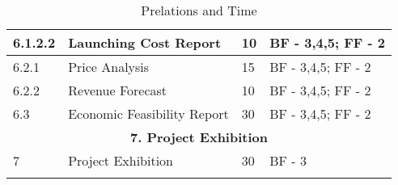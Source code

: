 \begin{longtable}{ | p{1.3cm} | p{7cm} | p{3cm} | p{3.5cm} |}
6.1.2.2 & Launching Cost Report  & 10 & BF - 3,4,5; FF - 2 \\ \hline
6.2.1 & Price Analysis & 15 & BF - 3,4,5; FF - 2  \\ \hline
6.2.2 & Revenue Forecast & 10 &BF - 3,4,5; FF - 2  \\ \hline
6.3 & Economic Feasibility Report & 30 & BF - 3,4,5; FF - 2 \\ \hline
\multicolumn{4}{|c|}{\textbf{7. Project Exhibition}} \\ \hline
7 & Project Exhibition &30 & BF - 3 \\ \hline
\caption{Prelations and Time} \\
\end{longtable}